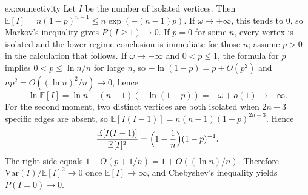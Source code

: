 \begin{solution}{ex:connectivity}
\writeup Let $I$ be the number of isolated vertices. Then $\mathbb E[I]=n(1-p)^{n-1}\le n\exp(-(n-1)p)$. If $\omega\to+\infty$, this tends to $0$, so Markov's inequality gives $P(I\ge1)\to0$. If $p=0$ for some $n$, every vertex is isolated and the lower-regime conclusion is immediate for those $n$; assume $p>0$ in the calculation that follows. If $\omega\to-\infty$ and $0<p\le1$, the formula for $p$ implies $0<p\le\ln n/n$ for large $n$, so $-\ln(1-p)=p+O(p^2)$ and $n p^2=O((\ln n)^2/n)\to0$, hence
\[
 \ln\mathbb E[I]=\ln n-(n-1)(-\ln(1-p))=-\omega+o(1)\to+\infty.
\] For the second moment, two distinct vertices are both isolated when $2n-3$ specific edges are absent, so $\mathbb E[I(I-1)]=n(n-1)(1-p)^{2n-3}$. Hence
\[
 \frac{\mathbb E[I(I-1)]}{\mathbb E[I]^2}=\Bigl(1-\frac1n\Bigr)(1-p)^{-1}.
\]
The right side equals $1+O(p+1/n)=1+O((\ln n)/n)$. Therefore $\mathrm{Var}(I)/\mathbb E[I]^2\to0$ once $\mathbb E[I]\to\infty$, and Chebyshev's inequality yields $P(I=0)\to0$.
\end{solution}


